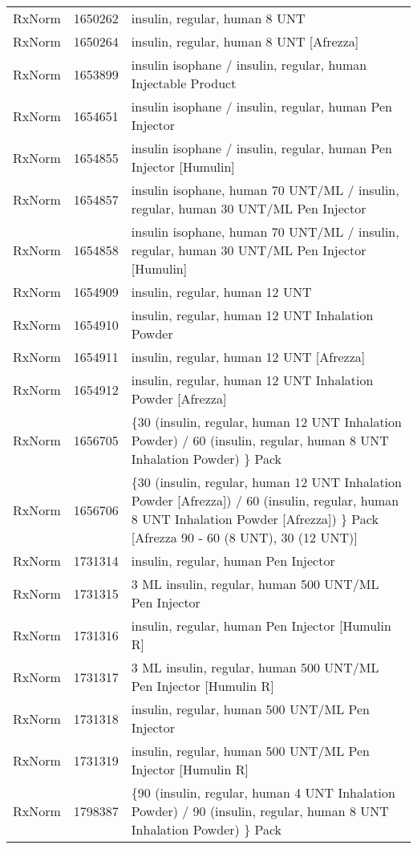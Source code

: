 \begin{longtable}{p{}p{}p{}}
  RxNorm & 1650262 & insulin, regular, human 8 UNT \\ 
  RxNorm & 1650264 & insulin, regular, human 8 UNT [Afrezza] \\ 
  RxNorm & 1653899 & insulin isophane / insulin, regular, human Injectable Product \\ 
  RxNorm & 1654651 & insulin isophane / insulin, regular, human Pen Injector \\ 
  RxNorm & 1654855 & insulin isophane / insulin, regular, human Pen Injector [Humulin] \\ 
  RxNorm & 1654857 & insulin isophane, human 70 UNT/ML / insulin, regular, human 30 UNT/ML Pen Injector \\ 
  RxNorm & 1654858 & insulin isophane, human 70 UNT/ML / insulin, regular, human 30 UNT/ML Pen Injector [Humulin] \\ 
  RxNorm & 1654909 & insulin, regular, human 12 UNT \\ 
  RxNorm & 1654910 & insulin, regular, human 12 UNT Inhalation Powder \\ 
  RxNorm & 1654911 & insulin, regular, human 12 UNT [Afrezza] \\ 
  RxNorm & 1654912 & insulin, regular, human 12 UNT Inhalation Powder [Afrezza] \\ 
  RxNorm & 1656705 & \{30 (insulin, regular, human 12 UNT Inhalation Powder) / 60 (insulin, regular, human 8 UNT Inhalation Powder) \} Pack \\ 
  RxNorm & 1656706 & \{30 (insulin, regular, human 12 UNT Inhalation Powder [Afrezza]) / 60 (insulin, regular, human 8 UNT Inhalation Powder [Afrezza]) \} Pack [Afrezza 90 - 60 (8 UNT), 30 (12 UNT)] \\ 
  RxNorm & 1731314 & insulin, regular, human Pen Injector \\ 
  RxNorm & 1731315 & 3 ML insulin, regular, human 500 UNT/ML Pen Injector \\ 
  RxNorm & 1731316 & insulin, regular, human Pen Injector [Humulin R] \\ 
  RxNorm & 1731317 & 3 ML insulin, regular, human 500 UNT/ML Pen Injector [Humulin R] \\ 
  RxNorm & 1731318 & insulin, regular, human 500 UNT/ML Pen Injector \\ 
  RxNorm & 1731319 & insulin, regular, human 500 UNT/ML Pen Injector [Humulin R] \\ 
  RxNorm & 1798387 & \{90 (insulin, regular, human 4 UNT Inhalation Powder) / 90 (insulin, regular, human 8 UNT Inhalation Powder) \} Pack \\ 

\end{longtable}
